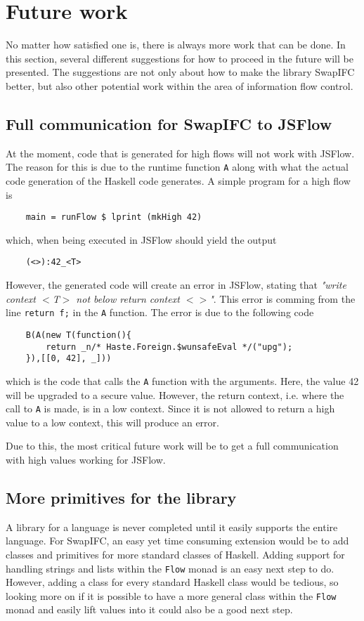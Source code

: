 \chapter{Future work}
\label{chapter:future}
No matter how satisfied one is, there is always more work that can be done. In this section, several different suggestions for how to proceed in the future will be presented. The suggestions are not only about how to make the library SwapIFC better, but also other potential work within the area of information flow control.

\section{Full communication for SwapIFC to JSFlow}
At the moment, code that is generated for high flows will not work with JSFlow. The reason for this is due to the runtime function {\tt A} along with what the actual code generation of the Haskell code generates. A simple program for a high flow is
\begin{verbatim}
    main = runFlow $ lprint (mkHigh 42)
\end{verbatim}
which, when being executed in JSFlow should yield the output
\begin{verbatim}
    (<>):42_<T>
\end{verbatim}
However, the generated code will create an error in JSFlow, stating that \emph{"write context \(<\)T\(>\) not below return context \(<>\)"}. This error is comming from the line {\tt return f;} in the {\tt A} function. The error is due to the following code
\begin{verbatim}
    B(A(new T(function(){
        return _n/* Haste.Foreign.$wunsafeEval */("upg");
    }),[[0, 42], _]))
\end{verbatim}
which is the code that calls the {\tt A} function with the arguments. Here, the value 42 will be upgraded to a secure value. However, the return context, i.e. where the call to {\tt A} is made, is in a low context. Since it is not allowed to return a high value to a low context, this will produce an error.

Due to this, the most critical future work will be to get a full communication with high values working for JSFlow.

\section{More primitives for the library}
\label{chapter:future-primitives}
A library for a language is never completed until it easily supports the entire language. For SwapIFC, an easy yet time consuming extension would be to add classes and primitives for more standard classes of Haskell. Adding support for handling strings and lists within the {\tt Flow} monad is an easy next step to do. However, adding a class for every standard Haskell class would be tedious, so looking more on if it is possible to have a more general class within the {\tt Flow} monad and easily lift values into it could also be a good next step.

